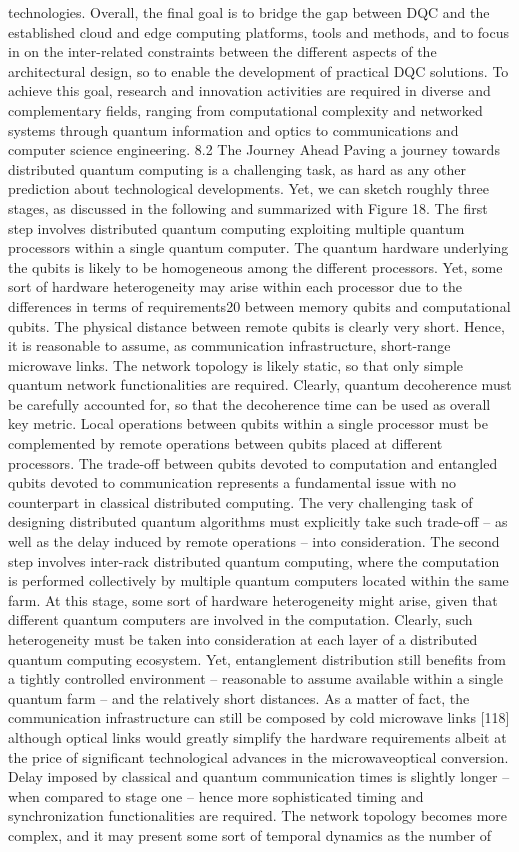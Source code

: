 technologies. Overall, the final goal is to bridge the gap between DQC and the established cloud and edge computing platforms, tools and methods, and to focus in on the inter-related constraints between the different aspects of the architectural design, so to enable the development of practical DQC solutions. To achieve this goal, research and innovation activities are required in diverse and complementary fields, ranging from computational complexity and networked systems through quantum information and optics to communications and computer science engineering. 8.2 The Journey Ahead Paving a journey towards distributed quantum computing is a challenging task, as hard as any other prediction about technological developments. Yet, we can sketch roughly three stages, as discussed in the following and summarized with Figure 18. The first step involves distributed quantum computing exploiting multiple quantum processors within a single quantum computer. The quantum hardware underlying the qubits is likely to be homogeneous among the different processors. Yet, some sort of hardware heterogeneity may arise within each processor due to the differences in terms of requirements20 between memory qubits and computational qubits. The physical distance between remote qubits is clearly very short. Hence, it is reasonable to assume, as communication infrastructure, short-range microwave links. The network topology is likely static, so that only simple quantum network functionalities are required. Clearly, quantum decoherence must be carefully accounted for, so that the decoherence time can be used as overall key metric. Local operations between qubits within a single processor must be complemented by remote operations between qubits placed at different processors. The trade-off between qubits devoted to computation and entangled qubits devoted to communication represents a fundamental issue with no counterpart in classical distributed computing. The very challenging task of designing distributed quantum algorithms must explicitly take such trade-off – as well as the delay induced by remote operations – into consideration. The second step involves inter-rack distributed quantum computing, where the computation is performed collectively by multiple quantum computers located within the same farm. At this stage, some sort of hardware heterogeneity might arise, given that different quantum computers are involved in the computation. Clearly, such heterogeneity must be taken into consideration at each layer of a distributed quantum computing ecosystem. Yet, entanglement distribution still benefits from a tightly controlled environment – reasonable to assume available within a single quantum farm – and the relatively short distances. As a matter of fact, the communication infrastructure can still be composed by cold microwave links [118] although optical links would greatly simplify the hardware requirements albeit at the price of significant technological advances in the microwaveoptical conversion. Delay imposed by classical and quantum communication times is slightly longer – when compared to stage one – hence more sophisticated timing and synchronization functionalities are required. The network topology becomes more complex, and it may present some sort of temporal dynamics as the number of 